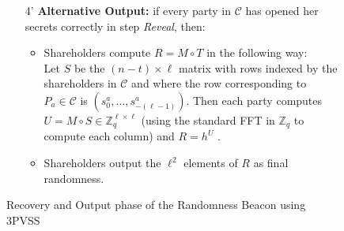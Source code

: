 \begin{figure}[t!]
\begin{tcolorbox}[title=\textbf{Randomness Beacon using 3PVSS, $\Lambda_{RO}^{packed}$ (cont.)}, width=0.9\textwidth, colframe=blue!75!black, colback=blue!10, sharp corners]
\begin{enumerate}
            \item [4']\textbf{Alternative Output:}  if every party in $\mathcal{C}$ has opened her secrets correctly in step \textit{Reveal}, then:
            \begin{itemize}
                \item Shareholders compute $R = M \circ T$ in the following way:\\
                    Let $S$ be the $(n - t) \times \ell$ matrix with rows indexed by the shareholders in $\mathcal{C}$ and where the row
                    corresponding to $P_a \in\mathcal{C}$ is $(s_0^a,...,s_{-(\ell-1)}^a )$. Then each party computes $U = M \circ S \in\mathbb{Z}_q^{\ell\times \ell}$ (using the standard FFT in $\mathbb{Z}_q$ to compute each column) and $R = h^U$ .
                \item Shareholders output the $\ell^2$ elements of $R$ as final randomness.
            \end{itemize}
        \end{enumerate}
    \end{tcolorbox}
    \caption{Recovery and Output phase of the Randomness Beacon using 3PVSS}
    \label{fig:randomness_beacon_cont}
\end{figure}